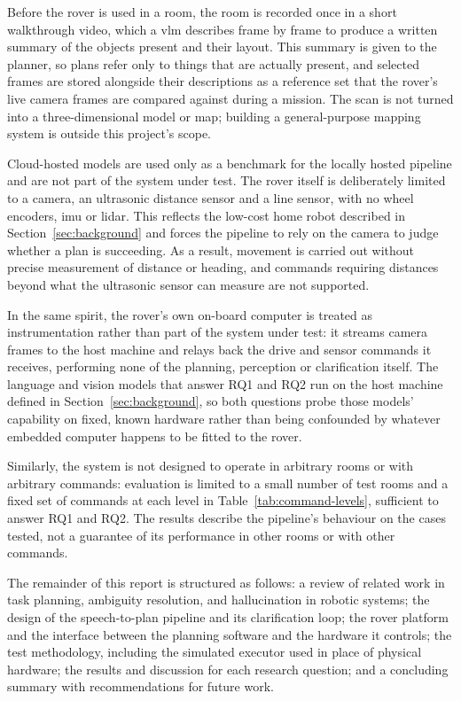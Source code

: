 Before the rover is used in a room, the room is recorded once in a short walkthrough video,
which a \ac{vlm} describes frame by frame to produce a written summary of the objects present
and their layout. This summary is given to the planner, so plans refer only to things that are
actually present, and selected frames are stored alongside their descriptions as a reference
set that the rover's live camera frames are compared against during a mission. The scan is not
turned into a three-dimensional model or map; building a general-purpose mapping system is
outside this project's scope.

Cloud-hosted models are used only as a benchmark for the locally hosted pipeline and are not
part of the system under test. The rover itself is deliberately limited to a camera, an
ultrasonic distance sensor and a line sensor, with no wheel encoders, \ac{imu} or \acs{lidar}. This
reflects the low-cost home robot described in Section~\ref{sec:background} and forces the
pipeline to rely on the camera to judge whether a plan is succeeding. As a result, movement is carried out without precise measurement of
distance or heading, and commands requiring distances beyond what the ultrasonic sensor can
measure are not supported.

In the same spirit, the rover's own on-board computer is treated as instrumentation rather
than part of the system under test: it streams camera frames to the host machine and relays
back the drive and sensor commands it receives, performing none of the planning, perception or
clarification itself. The language and vision models that answer RQ1 and RQ2 run on the host
machine defined in Section~\ref{sec:background}, so both questions probe those models'
capability on fixed, known hardware rather than being confounded by whatever embedded computer
happens to be fitted to the rover.

Similarly, the system is not designed to operate in arbitrary rooms or with arbitrary commands:
evaluation is limited to a small number of test rooms and a fixed set of commands at each level
in Table~\ref{tab:command-levels}, sufficient to answer RQ1 and RQ2. The results describe the
pipeline's behaviour on the cases tested, not a guarantee of its performance in other rooms or
with other commands.

\label{sec:report-outline}

The remainder of this report is structured as follows: a review of related work in task
planning, ambiguity resolution, and hallucination in robotic systems; the design of the
speech-to-plan pipeline and its clarification loop; the rover platform and the interface between
the planning software and the hardware it controls; the test methodology, including the
simulated executor used in place of physical hardware; the results and discussion for each
research question; and a concluding summary with recommendations for future work.